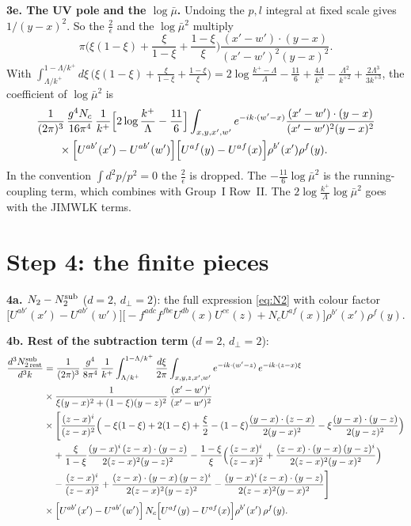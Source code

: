 \documentclass[10pt]{article}
\numberwithin{equation}{section}
\begin{document}
\textbf{3e. The UV pole and the $\log\bar\mu$.} Undoing the $p,l$ integral at fixed scale gives $1/(y-x)^{2}$. So the $\frac{2}{\epsilon}$ and the $\log\bar\mu^{2}$ multiply
\[
\pi\Big(\xi(1-\xi)+\frac{\xi}{1-\xi}+\frac{1-\xi}{\xi}\Big)\frac{(x'-w')\cdot(y-x)}{(x'-w')^{2}(y-x)^{2}} .
\]
With $\int_{\Lambda/k^{+}}^{1-\Lambda/k^{+}}d\xi\,\big(\xi(1-\xi)+\frac{\xi}{1-\xi}+\frac{1-\xi}{\xi}\big)=2\log\frac{k^{+}-\Lambda}{\Lambda}-\frac{11}{6}+\frac{4\Lambda}{k^{+}}-\frac{\Lambda^{2}}{k^{+2}}+\frac{2\Lambda^{3}}{3k^{+3}}$, the coefficient of $\log\bar\mu^{2}$ is
\begin{align}
&\frac{1}{(2\pi)^{3}}\,\frac{g^{4}N_{c}}{16\pi^{4}}\,\frac{1}{k^{+}}\Big[2\log\frac{k^{+}}{\Lambda}-\frac{11}{6}\Big]\int_{x,y,x',w'}e^{-ik\cdot(w'-x)}\frac{(x'-w')\cdot(y-x)}{(x'-w')^{2}(y-x)^{2}}\notag\\&\qquad\times\Big[U^{ab'}(x')-U^{ab'}(w')\Big]\Big[U^{af}(y)-U^{af}(x)\Big]\rho^{b'}(x')\rho^{f}(y).
\end{align}
In the convention $\int d^{2}p/p^{2}=0$ the $\frac{2}{\epsilon}$ is dropped. The $-\frac{11}{6}\log\bar\mu^{2}$ is the running-coupling term, which combines with Group~I Row~II. The $2\log\frac{k^{+}}{\Lambda}\log\bar\mu^{2}$ goes with the JIMWLK terms.

\section{Step 4: the finite pieces}
\textbf{4a. $N_{2}-N_{2}^{\rm sub}$} ($d=2$, $d_{\perp}=2$): the full expression \eqref{eq:N2} with colour factor
\[
\Big[U^{ab'}(x')-U^{ab'}(w')\Big]\Big[-f^{adc}f^{fbe}U^{db}(x)U^{ce}(z)+N_{c}U^{af}(x)\Big]\rho^{b'}(x')\rho^{f}(y).
\]

\textbf{4b. Rest of the subtraction term} ($d=2$, $d_{\perp}=2$):
\begin{align}
\frac{d^{3}N^{\rm sub}_{2\,\rm rest}}{d^{3}k}&=\frac{1}{(2\pi)^{3}}\,\frac{g^{4}}{8\pi^{4}}\,\frac{1}{k^{+}}\int_{\Lambda/k^{+}}^{1-\Lambda/k^{+}}\frac{d\xi}{2\pi}\int_{x,y,z,x',w'}e^{-ik\cdot(w'-z)}\,e^{-ik\cdot(z-x)\xi}\notag\\&\times\frac{1}{\xi(y-x)^{2}+(1-\xi)(y-z)^{2}}\,\frac{(x'-w')^{i}}{(x'-w')^{2}}\notag\\&\times\Bigg[\frac{(z-x)^{i}}{(z-x)^{2}}\Big(-\xi(1-\xi)+2(1-\xi)+\frac{\xi}{2}-(1-\xi)\frac{(y-x)\cdot(z-x)}{2(y-x)^{2}}-\xi\frac{(y-x)\cdot(y-z)}{2(y-z)^{2}}\Big)\notag\\
&\quad+\frac{\xi}{1-\xi}\frac{(y-x)^{i}\,(z-x)\cdot(y-z)}{2(z-x)^{2}(y-z)^{2}}-\frac{1-\xi}{\xi}\Big(\frac{(z-x)^{i}}{(z-x)^{2}}+\frac{(z-x)\cdot(y-x)\,(y-z)^{i}}{2(z-x)^{2}(y-x)^{2}}\Big)\notag\\
&\quad-\frac{(z-x)^{i}}{(z-x)^{2}}+\frac{(z-x)\cdot(y-x)\,(y-z)^{i}}{2(z-x)^{2}(y-z)^{2}}-\frac{(y-x)^{i}\,(z-x)\cdot(y-z)}{2(z-x)^{2}(y-x)^{2}}\Bigg]\notag\\
&\times\Big[U^{ab'}(x')-U^{ab'}(w')\Big]\,N_{c}\Big[U^{af}(y)-U^{af}(x)\Big]\rho^{b'}(x')\,\rho^{f}(y).
\end{align}
\end{document}
